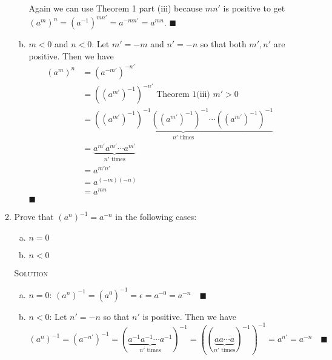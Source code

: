 \documentclass[twoside]{amsart}
\newcommand{\solution}{\textsc{Solution}\xspace}
\newcommand{\blank}{\vspace{5pt}}
\renewcommand{\qed}{\blacksquare}
\begin{document}
\begin{enumerate}[A.]
\begin{enumerate}[1]
\begin{enumerate}[(a)]
         Again we can use Theorem 1 part (iii) because $mn'$ is positive to
         get $(a^m)^n = (a^{-1})^{mn'} = a^{-mn'} = a^{mn}$. $\qed$

         \item $m<0$ and $n<0$. Let $m' = -m$ and $n' = -n$ so that both
         $m', n'$ are positive. Then we have
         \begin{align*} 
            (a^m)^n &= (a^{-m'})^{-n'} \\
                    &= ((a^{m'})^{-1})^{-n'} \text{ Theorem 1(iii) $m'>0$} \\
                    &= \underbrace{((a^{m'})^{-1})^{-1} ((a^{m'})^{-1})^{-1}
                        \cdots ((a^{m'})^{-1})^{-1}}_{n'\text{ times}} \\
                    &= \underbrace{a^{m'} a^{m'} \cdots a^{m'}}_{n'\text{ 
                    times}} \\
                    &= a^{m'n'} \\
                    &= a^{(-m)(-n)} \\
                    &= a^{mn}
         \end{align*}
         $\qed$

      \end{enumerate}

      \blank
      \item Prove that $(a^n)^{-1} = a^{-n}$ in the following cases:
      \begin{enumerate}[(a)]
         \item $n=0$
         \item $n<0$
      \end{enumerate}
      
      \blank \noindent \solution 
      \begin{enumerate}[(a)]
         \item $n=0$: $(a^n)^{-1} = (a^0)^{-1} = \epsilon = a^{-0} = a^{-n}
         \quad \qed$ 

         \item $n<0$: Let $n' = -n$ so that $n'$ is positive. Then
         we have 
         \[
         (a^n)^{-1} = (a^{-n'})^{-1} = (\underbrace{a^{-1} a^{-1} \cdots
         a^{-1}}_{n' \text{ times}})^{-1} = ((\underbrace{a a \cdots
         a}_{n'\text{ times}})^{-1})^{-1} = a^{n'} = a^{-n} \quad \qed
         \]

      \end{enumerate}
   \end{enumerate}


\end{enumerate}
\end{document}
